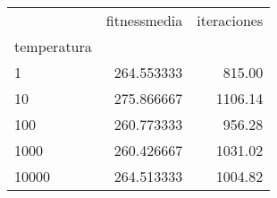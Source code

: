 \begin{tabular}{lrr}
\toprule
{} &  fitnessmedia &  iteraciones \\
temperatura &               &              \\
\midrule
1           &    264.553333 &       815.00 \\
10          &    275.866667 &      1106.14 \\
100         &    260.773333 &       956.28 \\
1000        &    260.426667 &      1031.02 \\
10000       &    264.513333 &      1004.82 \\
\bottomrule
\end{tabular}
